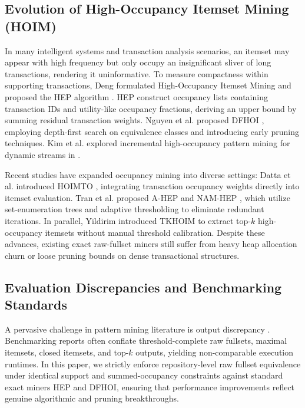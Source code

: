 \documentclass[runningheads,orivec]{llncs}
\newcommand{\HEP}{\textsc{HEP}}
\newcommand{\DFHOI}{\textsc{DFHOI}}
\begin{document}
\subsection{Evolution of High-Occupancy Itemset Mining (HOIM)}
In many intelligent systems and transaction analysis scenarios, an itemset may appear with high frequency but only occupy an insignificant sliver of long transactions, rendering it uninformative. To measure compactness within supporting transactions, Deng formulated High-Occupancy Itemset Mining and proposed the \HEP{} algorithm \cite{deng2020mining}. \HEP{} construct occupancy lists containing transaction IDs and utility-like occupancy fractions, deriving an upper bound by summing residual transaction weights. Nguyen et al. proposed \DFHOI{} \cite{nguyen2023efficient}, employing depth-first search on equivalence classes and introducing early pruning techniques. Kim et al. explored incremental high-occupancy pattern mining for dynamic streams in \cite{kim2022mining}.

Recent studies have expanded occupancy mining into diverse settings: Datta et al. introduced \textsc{HOIMTO} \cite{datta2021hoimto}, integrating transaction occupancy weights directly into itemset evaluation. Tran et al. proposed \textsc{A-HEP} and \textsc{NAM-HEP} \cite{tran2024hierarchical}, which utilize set-enumeration trees and adaptive thresholding to eliminate redundant iterations. In parallel, Yildirim introduced \textsc{TKHOIM} \cite{yildirim2025mining} to extract top-$k$ high-occupancy itemsets without manual threshold calibration. Despite these advances, existing exact raw-fullset miners still suffer from heavy heap allocation churn or loose pruning bounds on dense transactional structures.

\subsection{Evaluation Discrepancies and Benchmarking Standards}
A pervasive challenge in pattern mining literature is output discrepancy \cite{luna2019review}. Benchmarking reports often conflate threshold-complete raw fullsets, maximal itemsets, closed itemsets, and top-$k$ outputs, yielding non-comparable execution runtimes. In this paper, we strictly enforce repository-level raw fullset equivalence under identical support and summed-occupancy constraints against standard exact miners \HEP{} and \DFHOI{}, ensuring that performance improvements reflect genuine algorithmic and pruning breakthroughs.
\end{document}
